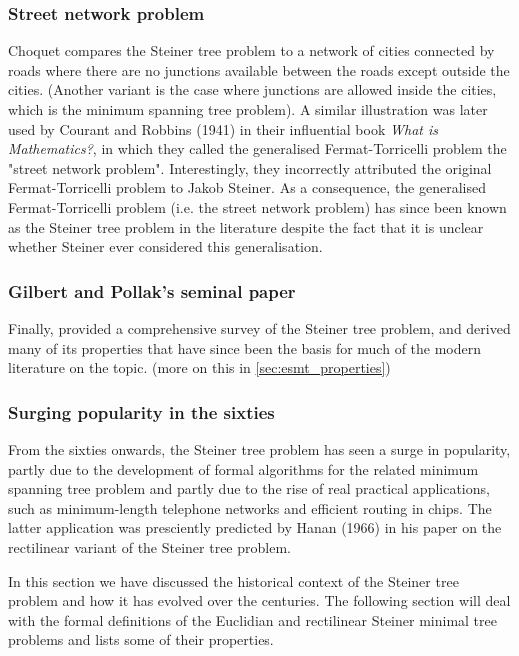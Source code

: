 \documentclass{l4proj}
\begin{document}
\subsubsection{Street network problem}
Choquet compares the Steiner tree problem to a network of cities connected by roads where there are no junctions available between the roads except outside the cities. (Another variant is the case where junctions are allowed inside the cities, which is the minimum spanning tree problem).
A similar illustration was later used by Courant and Robbins (1941) in their influential book \textit{What is Mathematics?}, in which they called the generalised Fermat-Torricelli problem the "street network problem". Interestingly, they incorrectly attributed the original Fermat-Torricelli problem to Jakob Steiner. As a consequence, the generalised Fermat-Torricelli problem (i.e. the street network problem) has since been known as the Steiner tree problem in the literature despite the fact that it is unclear whether Steiner ever considered this generalisation.

\subsubsection{Gilbert and Pollak's seminal paper}
Finally, \cite{Gilbert1968SteinerMT} provided a comprehensive survey of the Steiner tree problem, and derived many of its properties that have since been the basis for much of the modern literature on the topic. (more on this in \ref{sec:esmt_properties})

\subsubsection{Surging popularity in the sixties}
From the sixties onwards, the Steiner tree problem has seen a surge in popularity, partly due to the development of formal algorithms for the related minimum spanning tree problem and partly due to the rise of real practical applications, such as minimum-length telephone networks and efficient routing in chips. The latter application was presciently predicted by Hanan (1966) in his paper on the rectilinear variant of the Steiner tree problem.

In this section we have discussed the historical context of the Steiner tree problem and how it has evolved over the centuries. The following section will deal with the formal definitions of the Euclidian and rectilinear Steiner minimal tree problems and lists some of their properties.
\end{document}
